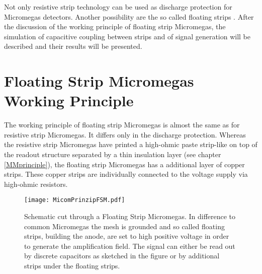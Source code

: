 \documentclass[
a4paper,                                %
twoside,                                %
BCOR1.4cm,                      %
10pt,                           %
headings=normal,                %
headsepline,                    %
clearplainpage, %
final,                                  %
div=14,
parskip=full,
openright,
bibliography=toc
]{scrreprt}
\begin{document}

Not only resistive strip technology can be used as discharge protection for Micromegas detectors. Another possibility are the so called floating strips \cite{jonaBthesis}. After the discussion of the working principle of floating strip Micromegas, the simulation of capacitive coupling between strips and of signal generation will be described and their results will be presented.

\section{Floating Strip Micromegas Working Principle}


The working principle of floating strip Micromegas is almost the same as for resistive strip Micromegas. It differs only in the discharge protection. Whereas the resistive strip Micromegas have printed a high-ohmic paste strip-like on top of the readout structure separated by a thin insulation layer (see chapter \ref{MMprinciple}), the floating strip Micromegas has a additional layer of copper strips. These copper strips are individually connected to the voltage supply via high-ohmic resistors.

\begin{figure}[H]
	\centering
	\texttt{[image: MicomPrinzipFSM.pdf]}
	\caption{Schematic cut through a Floating Strip Micromegas. In difference to common Micromegas the mesh is grounded and so called floating strips, building the anode, are set to high positive voltage in order to generate the amplification field. The signal can either be read out by discrete capacitors as sketched in the figure or by additional strips under the floating strips.\cite{jonaBthesis}}
	\label{fsmmprinciple}
\end{figure}
\end{document}
